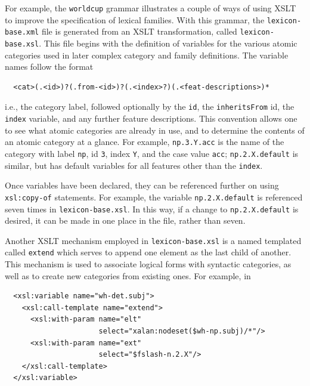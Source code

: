 \documentclass[11pt]{article}
\begin{document}
For example, the \texttt{worldcup} grammar illustrates a couple of ways
of using XSLT to improve the specification of lexical families. With
this grammar, the \texttt{lexicon-base.xml} file is generated from an
XSLT transformation, called \texttt{lexicon-base.xsl}. This file begins
with the definition of variables for the various atomic categories used
in later complex category and family definitions.  The variable names
follow the format

\begin{verbatim} 
  <cat>(.<id>)?(.from-<id>)?(.<index>?)(.<feat-descriptions>)*
\end{verbatim}

\noindent i.e., the category label, followed optionally by the
\texttt{id}, the \texttt{inheritsFrom} id, the \texttt{index} variable,
and any further feature descriptions. This convention allows one to see
what atomic categories are already in use, and to determine the contents
of an atomic category at a glance. For example, \texttt{np.3.Y.acc} is
the name of the category with label \texttt{np}, id \texttt{3}, index
\texttt{Y}, and the case value \texttt{acc}; 
\texttt{np.2.X.default} is similar, but has default variables for
all features other than the \texttt{index}.

Once variables have been declared, they can be referenced further on
using \texttt{xsl:copy-of} statements. For example, the variable
\texttt{np.2.X.default} is referenced seven times in
\texttt{lexicon-base.xsl}. In this way, if a change to
\texttt{np.2.X.default} is desired, it can be made in one place in the
file, rather than seven.

Another XSLT mechanism employed in \texttt{lexicon-base.xsl} is a named
templated called \texttt{extend} which serves to append one element as
the last child of another.  This mechanism is used to associate logical
forms with syntactic categories, as well as to create new categories
from existing ones.  For example, in

\begin{small}
\begin{verbatim} 
  <xsl:variable name="wh-det.subj">    
    <xsl:call-template name="extend">
      <xsl:with-param name="elt" 
                      select="xalan:nodeset($wh-np.subj)/*"/>
      <xsl:with-param name="ext" 
                      select="$fslash-n.2.X"/>
    </xsl:call-template>
  </xsl:variable>
\end{verbatim}
\end{small}
\end{document}
